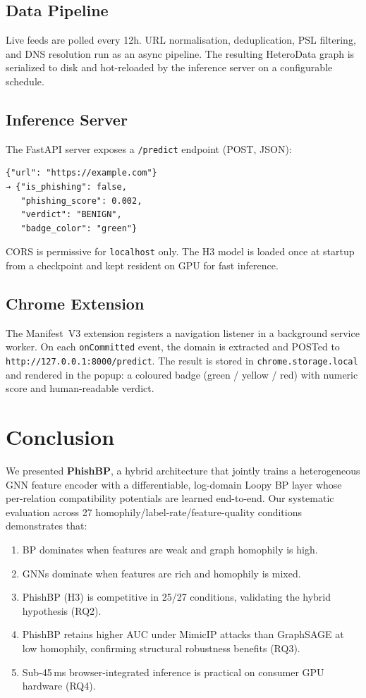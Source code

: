 \documentclass[conference]{IEEEtran}
\begin{document}
\subsection{Data Pipeline}
Live feeds are polled every 12h. URL normalisation, deduplication, PSL
filtering, and DNS resolution run as an async pipeline. The resulting
HeteroData graph is serialized to disk and hot-reloaded by the inference
server on a configurable schedule.

\subsection{Inference Server}
The FastAPI server exposes a \texttt{/predict} endpoint (POST, JSON):
\begin{verbatim}
{"url": "https://example.com"}
→ {"is_phishing": false,
   "phishing_score": 0.002,
   "verdict": "BENIGN",
   "badge_color": "green"}
\end{verbatim}
CORS is permissive for \texttt{localhost} only. The H3 model is loaded once
at startup from a checkpoint and kept resident on GPU for fast inference.

\subsection{Chrome Extension}
The Manifest~V3 extension registers a navigation listener in a background
service worker. On each \texttt{onCommitted} event, the domain is extracted
and POSTed to \texttt{http://127.0.0.1:8000/predict}. The result is stored
in \texttt{chrome.storage.local} and rendered in the popup: a coloured badge
(green / yellow / red) with numeric score and human-readable verdict.

\section{Conclusion}
\label{sec:conclusion}

We presented \textbf{PhishBP}, a hybrid architecture that jointly trains a
heterogeneous GNN feature encoder with a differentiable, log-domain Loopy BP
layer whose per-relation compatibility potentials are learned end-to-end. Our
systematic evaluation across 27 homophily/label-rate/feature-quality conditions
demonstrates that:

\begin{enumerate}
  \item BP dominates when features are weak and graph homophily is high.
  \item GNNs dominate when features are rich and homophily is mixed.
  \item PhishBP (H3) is competitive in 25/27 conditions, validating the
  hybrid hypothesis (RQ2).
  \item PhishBP retains higher AUC under MimicIP attacks than GraphSAGE at
  low homophily, confirming structural robustness benefits (RQ3).
  \item Sub-45\,ms browser-integrated inference is practical on consumer
  GPU hardware (RQ4).
\end{enumerate}
\end{document}
